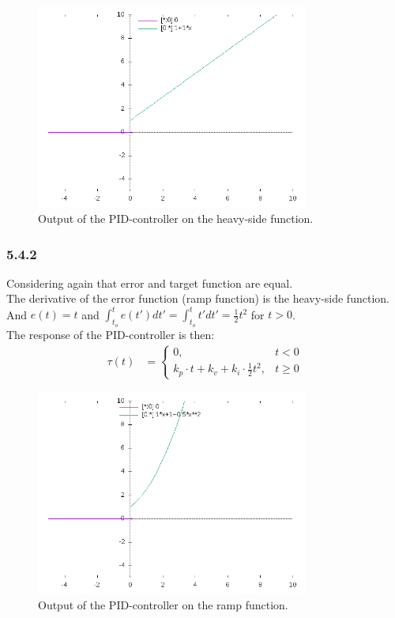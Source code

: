 \begin{figure}[!h]
\centering
\includegraphics[width= 0.8\textwidth ]{task541.png}
\caption{Output of the PID-controller on the heavy-side function.}
\end{figure}

\subsubsection*{5.4.2}

Considering again that error and target function are equal.\\
The derivative of the error function (ramp function) is the heavy-side function.
And $e(t) = t$ and $\int_{t_o}^{t}e(t')dt' = \int_{t_o}^{t}t'dt' = \frac{1}{2}t^2$ for $t > 0$.\\
The response of the PID-controller is then:
\begin{align*}
\tau(t) &= 
\begin{cases}
0, & t < 0\\
k_p \cdot t + k_v + k_i \cdot \frac{1}{2}t^2, & t \ge 0
\end{cases}
\end{align*}

\begin{figure}[!h]
	\centering
	\includegraphics[width= 0.8\textwidth ]{task542.png}
	\caption{Output of the PID-controller on the ramp function.}
\end{figure}




